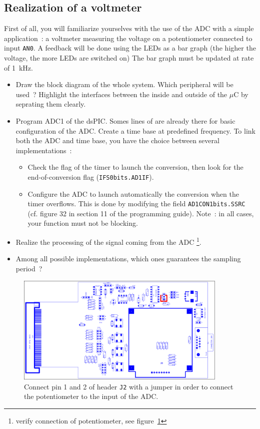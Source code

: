 \documentclass[11pt,a4paper]{article}
\theoremstyle{definition}%
\begin{document}
\subsection{Realization of a voltmeter}
First of all, you will familiarize yourselves with the use of the ADC with a simple application~: a voltmeter measuring the voltage on a potentiometer connected to input \texttt{AN0}.
A feedback will be done using the LEDs as a bar graph (the higher the voltage, the more LEDs are switched on)
The bar graph must be updated at rate of 1~kHz.
\begin{itemize}
	\item Draw the block diagram of the whole system.
	Which peripheral will be used~?
    Highlight the interfaces between the inside and outside of the $\mu$C by seprating them clearly.
	\item Program ADC1 of the dsPIC. Somes lines of are already there for basic configuration of the ADC.
    Create a time base at predefined frequency. To link both the ADC and time base, you have the choice between several implementations~:
	\begin{itemize}
		\item Check the flag of the timer to launch the conversion, then look for the end-of-conversion flag (\texttt{IFS0bits.AD1IF}).
		\item Configure the ADC to launch automatically the conversion when the timer overflows.
        This is done by modifying the field \texttt{AD1CON1bits.SSRC} (cf. figure 32 in section 11 of the programming guide).
		Note~: in all cases, your function must not be blocking.
	\end{itemize}
	\item Realize the processing of the signal coming from the ADC \footnote{verify connection of potentiometer, see figure~\ref{fig:extension-board-jumper}}.
	\item Among all possible implementations, which ones guarantees the sampling period~?
\end{itemize}

\begin{figure}[h]
\centering
\includegraphics[width=0.9\textwidth]{extension-board-jumper}
\caption{Connect pin 1 and 2 of header \texttt{J2} with a jumper in order to connect the potentiometer to the input of the ADC.}
\label{fig:extension-board-jumper}
\end{figure}
\end{document}
